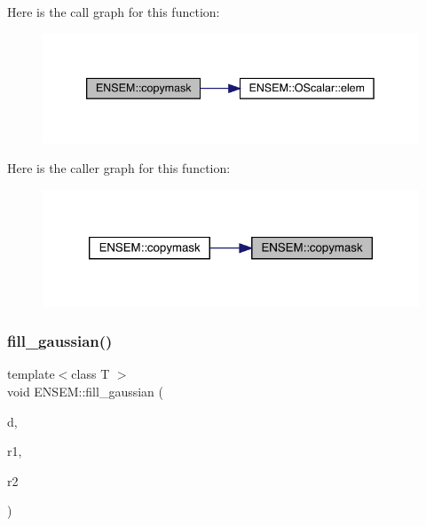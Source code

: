 Here is the call graph for this function\+:\nopagebreak
\begin{figure}[H]
\begin{center}
\leavevmode
\includegraphics[width=339pt]{d8/d55/group__obsmatrix_gaa09c3011b1e6555dcc6e4f9b51d1f5de_cgraph}
\end{center}
\end{figure}
Here is the caller graph for this function\+:\nopagebreak
\begin{figure}[H]
\begin{center}
\leavevmode
\includegraphics[width=320pt]{d8/d55/group__obsmatrix_gaa09c3011b1e6555dcc6e4f9b51d1f5de_icgraph}
\end{center}
\end{figure}
\mbox{\label{group__obsmatrix_ga5abeb3bfc7329fc57387aefff992eb94}} 
\subsubsection{\texorpdfstring{fill\_gaussian()}{fill\_gaussian()}}
{\footnotesize\ttfamily template$<$class T $>$ \\
void E\+N\+S\+E\+M\+::fill\+\_\+gaussian (\begin{DoxyParamCaption}\item[{\mbox{\hyperlink{classENSEM_1_1OMatrix}{O\+Matrix}}$<$ T $>$ \&}]{d,  }\item[{\mbox{\hyperlink{classENSEM_1_1OMatrix}{O\+Matrix}}$<$ T $>$ \&}]{r1,  }\item[{\mbox{\hyperlink{classENSEM_1_1OMatrix}{O\+Matrix}}$<$ T $>$ \&}]{r2 }\end{DoxyParamCaption})\hspace{0.3cm}{\ttfamily [inline]}}



